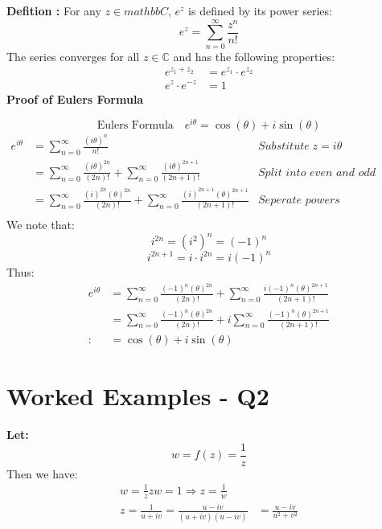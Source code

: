 \documentclass[a4paper, 8pt]{extarticle}
\begin{document}
\begin{examplebox}[Define the complex exponential function $e^z$ and prove Eulers Foruma $e^{i \theta} = \cos(\theta) + i\sin\theta$]
	\label{sol:2017Q1b}
	\textbf{Defition :} For any $z \in mathbb{C}$, $e^z$ is defined by its power series:
	$$e^z = \sum_{n=0}^{\infty} \frac{z^n}{n!}$$
	The series converges for all $z \in \mathbb{C}$ and has the following properties:
	\begin{align*}
		e^{z_1 + z_2}      & = e^{z_1} \cdot e^{z_2} \\
		e^{z} \cdot e^{-z} & = 1
	\end{align*}
	\textbf{Proof of Eulers Formula}

	$$\text{Eulers Formula} \quad e^{i \theta} = \cos(\theta) + i\sin(\theta)$$
	\begin{align*}
		e^{i \theta} & =  \textstyle\sum_{n=0}^{\infty}  \frac{(i\theta)^n}{n!}                                                                             & \textit{Substitute}\; z=i\theta         \\
		             & = \textstyle\sum_{n=0}^{\infty} \frac{(i\theta)^{2n}}{(2n)!} + \sum_{n=0}^{\infty} \frac{(i\theta)^{2n+1}}{(2n+1)!}                  & \textit{Split into even and odd powers} \\
		             & = \textstyle\sum_{n=0}^{\infty} \frac{(i)^{2n}(\theta)^{2n}}{(2n)!} + \sum_{n=0}^{\infty} \frac{(i)^{2n+1} (\theta)^{2n+1}}{(2n+1)!} & \textit{Seperate powers}                \\
	\end{align*}
	\quad We note that:
	$$i^{2n} = (i^{2})^n = (-1)^n$$
	$$i^{2n+1} = i \cdot i^{2n} = i(-1)^n$$
	Thus:
	\begin{align*}
		e^{i \theta} & =  \textstyle\sum_{n=0}^{\infty} \frac{(-1)^n(\theta)^{2n}}{(2n)!}
		+ \sum_{n=0}^{\infty} \frac{i(-1)^n (\theta)^{2n+1}}{(2n+1)!}                     \\
		             & = \textstyle\sum_{n=0}^{\infty} \frac{(-1)^n(\theta)^{2n}}{(2n)!}
		+ i\sum_{n=0}^{\infty} \frac{(-1)^n (\theta)^{2n+1}}{(2n+1)!}                     \\:
		             & = \cos(\theta) + i\sin(\theta)
	\end{align*}
\end{examplebox}
\section{Worked Examples - Q2}
\begin{examplebox}[Determine the image of the line $f(z) = \frac{1}{z} \quad \{z \in \mathbb{C}: \text{Re}(z) = 2\}$]
	\textbf{Let:}
	$$w = f(z) = \frac{1}{z}$$
	Then we have:
	\begin{align*}

		w = \frac{1}{z}   		zw = 1  \Rightarrow z = \frac{1}{w}                        \\
		z      = \frac{1}{u+iv} = \frac{u-iv}{(u+iv)(u-iv)} & = \frac{u-iv}{u^2 + v^2}
	\end{align*}
\end{examplebox}

\begin{examplebox}[Determine the image of the line $f(z) = \frac{1}{z} \quad \{z \in \mathbb{C}: \text{Re}(z) = 1\}$]

\end{examplebox}
\end{document}
